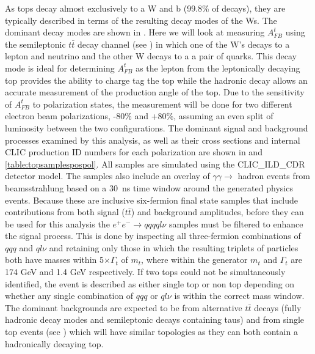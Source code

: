 As tops decay almost exclusively to a W and b (99.8\% of decays), they are typically described in terms of the resulting decay modes of the Ws. The dominant decay modes are shown in . Here we will look at measuring $A_{FB}^{t}$ using the semileptonic $t\bar{t}$ decay channel (see ) in which one of the W's decays to a lepton and neutrino and the other W decays to a a pair of quarks. This decay mode is ideal for determining $A_{FB}^{t}$ as the lepton from the leptonically decaying top provides the ability to charge tag the top while the hadronic decay allows an accurate measurement of the production angle of the top. Due to the sensitivity of $A_{FB}^{t}$ to polarization states, the measurement will be done for two different electron beam polarizations, -80\% and +80\%, assuming an even split of luminosity between the two configurations. The dominant signal and background processes examined by this analysis, as well as their cross sections and internal \ac{CLIC} production ID numbers for each polarization are shown in  and \ref{table:topsamplespospol}. All samples are simulated using the CLIC\_ILD\_CDR detector model. The samples also include an overlay of $\gamma\gamma\rightarrow$ hadron events from beamsstrahlung based on a 30~ns time window around the generated physics events. Because these are inclusive six-fermion final state samples that include contributions from both signal ($t\bar{t}$) and background amplitudes, before they can be used for this analysis the $e^+e^-\rightarrow qqqql\nu$ samples must be filtered to enhance the signal process. This is done by inspecting all three-fermion combinations of $qqq$ and $ql\nu$ and retaining only those in which the resulting triplets of particles both have masses within 5$\times\Gamma_t$ of $m_t$, where within the generator $m_t$ and $\Gamma_t$ are 174 GeV and 1.4 GeV respectively. If two tops could not be simultaneously identified, the event is described as either single top or non top depending on whether any single combination of $qqq$ or $ql\nu$ is within the correct mass window. The dominant backgrounds are expected to be from alternative $t\bar{t}$ decays (fully hadronic decay modes and semileptonic decays containing taus) and from single top events (see ) which will have similar topologies as they can both contain a hadronically decaying top.

